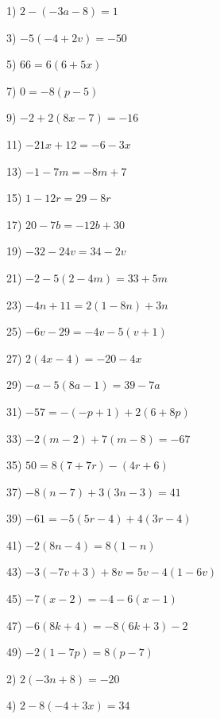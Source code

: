 \documentclass[11pt]{book}
\theoremstyle{definition}  %
\begin{document}
\begin{multicols}{2}
  1) $2 - (- 3 a - 8) = 1$ \ \ \ \ \ \ \ \ \ \
  
  3) $- 5 (- 4 + 2 v) = - 50$ \ \ \ \ \ \ \ \ \ \
  
  5) $66 = 6 (6 + 5 x) $ \ \ \ \ \ \ \ \ \ \ \ \ \ \ \ \ \ \ \ \
  
  7) $0 = - 8 (p - 5)$ \ \ \ \ \ \ \ \ \ \ \ \ \ \ \ \ \ \ \ \ \ \ \
  
  9) $- 2 + 2 (8 x - 7) = - 16$ \ \ \ \ \ \ \ \ \ \ \
  
  11) $- 21 x + 12 = - 6 - 3 x$ \ \ \ \ \ \ \ \ \ \ \ \ \ \
  
  13) $- 1 - 7 m = - 8 m + 7$ \ \ \ \ \ \ \ \ \ \ \ \ \ \
  
  15) $1 - 12 r = 29 - 8 r$ \ \ \ \ \ \ \ \ \ \ \ \ \ \ \
  
  17) $20 - 7 b = - 12 b + 30$ \ \ \ \ \ \ \ \ \ \ \ \ \ \ \ \ \
  
  19) $- 32 - 24 v = 34 - 2 v$ \ \ \ \ \ \ \ \ \ \ \ \
  
  21) $- 2 - 5 (2 - 4 m) = 33 + 5 m$ \ \ \ \ \ \ \ \
  
  23) $- 4 n + 11 = 2 (1 - 8 n) + 3 n$ \ \ \ \ \ \
  
  25) $- 6 v - 29 = - 4 v - 5 (v + 1) $ \ \ \ \ \ \
  
  27) $2 (4 x - 4) = - 20 - 4 x$ \ \ \ \ \ \ \ \ \ \ \ \ \
  
  29) $- a - 5 (8 a - 1) = 39 - 7 a$ \ \ \ \ \ \ \
  
  31) $- 57 = - (- p + 1) + 2 (6 + 8 p)$ \ \ \ \
  
  33) $- 2 (m - 2) + 7 (m - 8) = - 67$ \ \ \
  
  35) $50 = 8 (7 + 7 r) - (4 r + 6)$ \ \ \ \ \ \ \ \
  
  37) $- 8 (n - 7) + 3 (3 n - 3) = 41$ \ \ \ \ \ \ \
  
  39) $- 61 = - 5 (5 r - 4) + 4 (3 r - 4)$ \
  
  41) $- 2 (8 n - 4) = 8 (1 - n)$ \ \ \ \ \ \ \ \ \ \ \ \
  
  43) $- 3 (- 7 v + 3) + 8 v = 5 v - 4 (1 - 6 v) $
  
  45) $- 7 (x - 2) = - 4 - 6 (x - 1)$ \ \ \ \ \ \ \ \ \
  
  47) $- 6 (8 k + 4) = - 8 (6 k + 3) - 2$ \ \ \ \ \
  
  49) $- 2 (1 - 7 p) = 8 (p - 7)$ \ \ \ \ \ \ \ \ \ \ \ \
  
  2) $2 (- 3 n + 8) = - 20$
  
  4) $2 - 8 (- 4 + 3 x) = 34$
  

\end{multicols}
\end{document}
